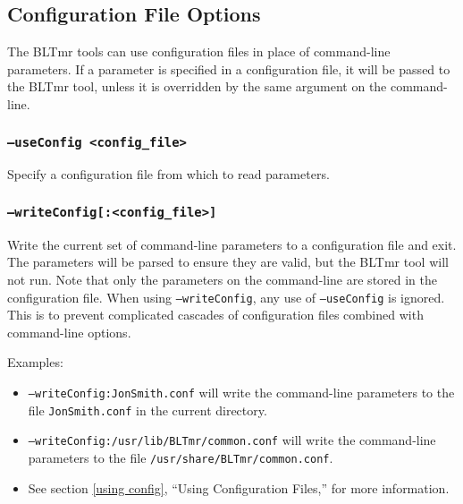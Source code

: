 \subsection{Configuration File Options}
\label{config options}
The BLTmr tools can use configuration files in place of command-line parameters. 
If a parameter is specified in a configuration file, it will be passed to the 
BLTmr tool, unless it is overridden by the same argument on the command-line. 

\subsubsection{\texttt{--useConfig <config\_file>}}
\label{useConfig}
Specify a configuration file from which to read parameters.

\subsubsection{\texttt{--writeConfig[:<config\_file>]}}
Write the current set of command-line parameters to a configuration file and 
exit. The parameters will be parsed to ensure they are valid, but the BLTmr tool
will not run.  Note that only the parameters on the command-line are stored in
the configuration file. When using \texttt{--writeConfig}, any use of
\texttt{--useConfig} is ignored. This is to prevent complicated cascades
of configuration files combined with command-line options.

Examples:
\begin{itemize}
  \item \texttt{--writeConfig:JonSmith.conf} will write the command-line 
  parameters to the file \texttt{JonSmith.conf} in the current directory.
  \item \texttt{--writeConfig:/usr/lib/BLTmr/common.conf} will write the
  command-line parameters to the file \texttt{/usr/share/BLTmr/common.conf}. 
  \item See section \ref{using config}, ``Using Configuration Files,'' for
  more information.
\end{itemize}
